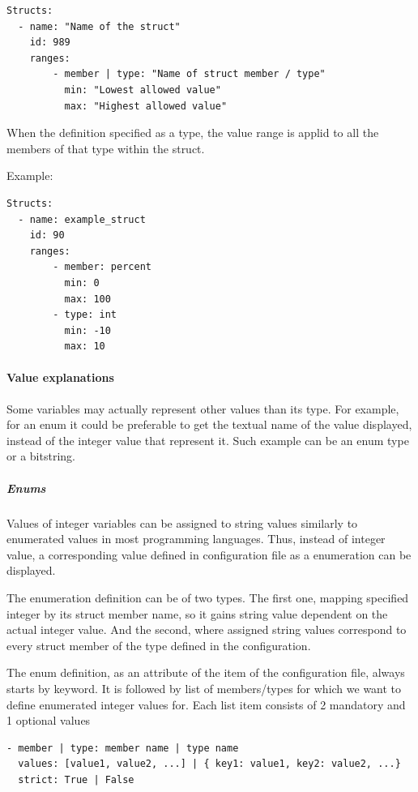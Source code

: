 \documentclass[A4paper,10pt,english]{sphinxmanual}
\begin{document}
\begin{Verbatim}[commandchars=\\\{\}]
Structs:
  - name: "Name of the struct"
    id: 989
    ranges:
        - member | type: "Name of struct member / type"
          min: "Lowest allowed value"
          max: "Highest allowed value"
\end{Verbatim}

When the definition specified as a type, the value range is applid to all the members of that type within the struct.

Example:

\begin{Verbatim}[commandchars=\\\{\}]
Structs:
  - name: example_struct
    id: 90
    ranges:
        - member: percent
          min: 0
          max: 100
        - type: int
          min: -10
          max: 10
\end{Verbatim}


\paragraph{Value explanations}
\label{user/config:value-explanations}
Some variables may actually represent other values than its type. For example, for an enum it could be preferable to get the textual name of the value displayed, instead of the integer value that represent it. Such example can be an enum type or a bitstring.


\subparagraph{Enums}
\label{user/config:enums}
Values of integer variables can be assigned to string values similarly to enumerated values in most programming languages. Thus, instead of integer value, a corresponding value defined in configuration file as a enumeration can be displayed.

The enumeration definition can be of two types. The first one, mapping specified integer by its struct member name, so it gains string value dependent on the actual integer value. And the second, where assigned string values correspond to every struct member of the type defined in the configuration.

The enum definition, as an attribute of the  item of the configuration file, always starts by  keyword. It is followed by list of members/types for which we want to define enumerated integer values for. Each list item consists of 2 mandatory and 1 optional values

\begin{Verbatim}[commandchars=\\\{\}]
- member | type: member name | type name
  values: [value1, value2, ...] | { key1: value1, key2: value2, ...}
  strict: True | False
\end{Verbatim}
\end{document}
